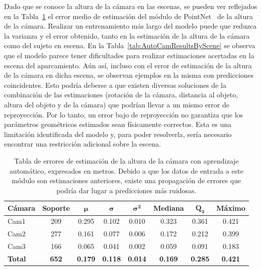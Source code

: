 Dado que se conoce la altura de la cámara en las escenas,
se pueden ver reflejados en la Tabla~\ref{tab:AutoCamResults}
el error medio de estimación del módulo de PointNet~\cite{PointNet} de la altura de la cámara.
Realizar un entrenamiento más largo del modelo puede que reduzca la varianza y el error obtenido,
tanto en la estimación de la altura de la cámara como del sujeto en escena.
En la Tabla~\ref{tab:AutoCamResultsByScene} se observa que el modelo parece tener dificultades para
realizar estimaciones acertadas en la escena del aparcamiento.
Aún así, incluso con el error de estimación de la altura de la cámara en dicha escena, se observan
ejemplos en la misma con predicciones coincidentes. Esto podría deberse a que existen diversas soluciones de la
combinación de las estimaciones (rotación de la cámara, distancia al objeto, altura del objeto y de la cámara)
que podrían llevar a un mismo error de reproyección. Por lo tanto, un error bajo de reproyección
no garantiza que los parámetros geométricos estimados sean físicamente correctos. Esta es una
limitación identificada del modelo y, para poder resolverla, sería necesario
encontrar una restricción adicional sobre la escena.

\begin{table}[!ht]
  \centering
  \scriptsize
\begin{tabular}{|l|c|c|c|c|c|c|c|}
\hline
\rowcolor[HTML]{FFCB2F}
\textbf{Cámara} & \textbf{Soporte} & $\bm{\mu}$ & $\bm{\sigma}$ & $\bm{\sigma^2}$ & \textbf{Mediana} & $\bm{Q_3}$ & \textbf{Máximo} \\
\hline
Cam1 & 209 & 0.295 & 0.102 & 0.010 &0.323 & 0.361 & 0.421 \\
\hline
Cam2 & 277 & 0.161 & 0.077 & 0.006 &0.172 & 0.212 & 0.399 \\
\hline
Cam3 & 166 & 0.065 & 0.041 & 0.002 &0.059 & 0.091 & 0.183 \\
\hline
\textbf{Total} & \textbf{652} & \textbf{0.179} & \textbf{0.118} & \textbf{0.014} & \textbf{0.169} & \textbf{0.285} & \textbf{0.421} \\
\hline
\end{tabular}
\caption[Tabla de errores de estimación de la altura de la cámara con aprendizaje automático, expresados en metros.]{
  Tabla de errores de estimación de la altura de la cámara con aprendizaje automático, expresados en metros.
  Debido a que los datos de entrada a este módulo son estimaciones anteriores, existe una propagación de errores que podría dar lugar a predicciones más ruidosas.
}
\label{tab:AutoCamResults}
\end{table}

